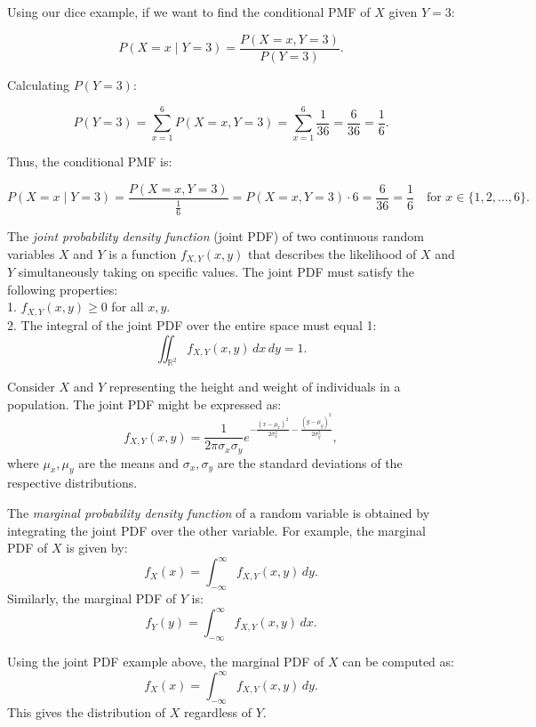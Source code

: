 \begin{example}
    Using our dice example, if we want to find the conditional PMF of \( X \) given \( Y = 3 \):

\[
P(X = x \mid Y = 3) = \frac{P(X = x, Y = 3)}{P(Y = 3)}.
\]

Calculating \( P(Y = 3) \):

\[
P(Y = 3) = \sum_{x=1}^{6} P(X = x, Y = 3) = \sum_{x=1}^{6} \frac{1}{36} = \frac{6}{36} = \frac{1}{6}.
\]

Thus, the conditional PMF is:

\[
P(X = x \mid Y = 3) = \frac{P(X = x, Y = 3)}{\frac{1}{6}} = P(X = x, Y = 3) \cdot 6 = \frac{6}{36} = \frac{1}{6} \quad \text{for } x \in \{1, 2, \ldots, 6\}.
\]
\end{example}

\begin{definition}
    The \textit{joint probability density function} (joint PDF) of two continuous random variables \( X \) and \( Y \) is a function \( f_{X,Y}(x,y) \) that describes the likelihood of \( X \) and \( Y \) simultaneously taking on specific values. The joint PDF must satisfy the following properties:\\

1. \( f_{X,Y}(x,y) \geq 0 \) for all \( x, y \).\\
2. The integral of the joint PDF over the entire space must equal 1:
\[
\iint_{\mathbb{R}^2} f_{X,Y}(x,y) \, dx \, dy = 1.
\]
\end{definition}

    Consider \( X \) and \( Y \) representing the height and weight of individuals in a population. The joint PDF might be expressed as:
\[
f_{X,Y}(x,y) = \frac{1}{2\pi \sigma_x \sigma_y} e^{-\frac{(x - \mu_x)^2}{2\sigma_x^2} - \frac{(y - \mu_y)^2}{2\sigma_y^2}},
\]
where \( \mu_x, \mu_y \) are the means and \( \sigma_x, \sigma_y \) are the standard deviations of the respective distributions.

\begin{definition}
    The \textit{marginal probability density function} of a random variable is obtained by integrating the joint PDF over the other variable. For example, the marginal PDF of \( X \) is given by:
\[
f_X(x) = \int_{-\infty}^{\infty} f_{X,Y}(x,y) \, dy.
\]
Similarly, the marginal PDF of \( Y \) is:
\[
f_Y(y) = \int_{-\infty}^{\infty} f_{X,Y}(x,y) \, dx.
\]
\end{definition}

Using the joint PDF example above, the marginal PDF of \( X \) can be computed as:
\[
f_X(x) = \int_{-\infty}^{\infty} f_{X,Y}(x,y) \, dy.
\]
This gives the distribution of \( X \) regardless of \( Y \).

